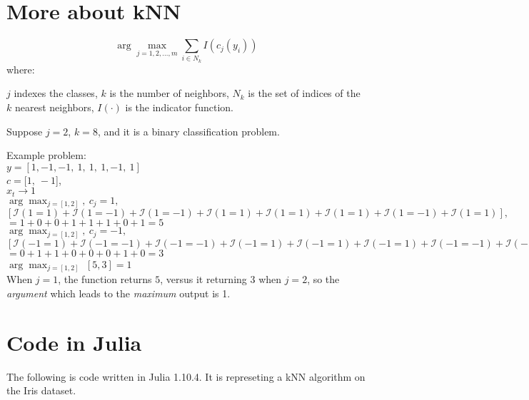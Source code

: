 \section{More about kNN \cite{guo2003knn}}

\begin{equation}
    \arg\max_{j=1,2,\ldots,m} \sum_{i \in N_k} I(c_j(y_i))
\end{equation}
where:
\begin{outline}
    \1 $j$ indexes the classes,
    \1 $k$ is the number of neighbors,
    \1 $N_k$ is the set of indices of the $k$ nearest neighbors,
    \1 $I(\cdot)$ is the indicator function.
\end{outline}

Suppose $j=2$, $k=8$, and it is a binary classification problem.
 

Example problem: \\
$y=[1,-1,-1, \ 1, \ 1, \ 1,-1, \ 1]$ \\
$c = [1, \ -1$], \\
$x_t \rightarrow 1$ \\
$\arg\max_{j=[1,2]}, \ c_j=1, $ \\$[\mathcal{I}(1=1)+\mathcal{I}(1=-1)+\mathcal{I}(1=-1)+\mathcal{I}(1=1)+\mathcal{I}(1=1)+\mathcal{I}(1=1)+\mathcal{I}(1=-1)+\mathcal{I}(1=1)],$ \\
$= 1+0+0+1+1+1+0+1 = 5$\\
$\arg\max_{j=[1,2]}, \ c_j=-1, $ \\
$[\mathcal{I}(-1=1)+\mathcal{I}(-1=-1)+\mathcal{I}(-1=-1)+\mathcal{I}(-1=1)+\mathcal{I}(-1=1)+\mathcal{I}(-1=1)+\mathcal{I}(-1=-1)+\mathcal{I}(-1=1)]$ \\
$= 0+1+1+0+0+0+1+0 = 3$\\
$\arg\max_{j=[1,2]}$ $[5,3]=1$ \\
When $j = 1$, the function returns $5$, versus it returning $3$ when $j = 2$,
so the \textit{argument} which leads to the \textit{maximum} output is
1.


\section{Code in Julia}
The following is code written in Julia 1.10.4. 
It is represeting a kNN algorithm on the Iris dataset.

